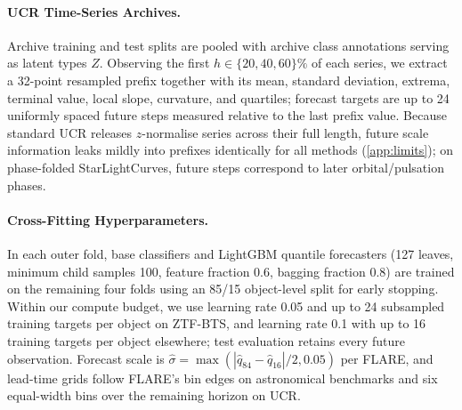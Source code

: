 \paragraph{UCR Time-Series Archives.}
Archive training and test splits are pooled with archive class annotations serving as latent types $Z$.
Observing the first $h\in\{20,40,60\}\%$ of each series, we extract a 32-point resampled prefix together with its mean, standard deviation, extrema, terminal value, local slope, curvature, and quartiles; forecast targets are up to 24 uniformly spaced future steps measured relative to the last prefix value.
Because standard UCR releases $z$-normalise series across their full length, future scale information leaks mildly into prefixes \citep{renault2025early} identically for all methods (\cref{app:limits}); on phase-folded StarLightCurves, future steps correspond to later orbital/pulsation phases.

\paragraph{Cross-Fitting Hyperparameters.}
In each outer fold, base classifiers and LightGBM quantile forecasters (127 leaves, minimum child samples 100, feature fraction 0.6, bagging fraction 0.8) are trained on the remaining four folds using an 85/15 object-level split for early stopping.
Within our compute budget, we use learning rate 0.05 and up to 24 subsampled training targets per object on ZTF-BTS, and learning rate 0.1 with up to 16 training targets per object elsewhere; test evaluation retains every future observation.
Forecast scale is $\hat\sigma=\max(|\hat q_{84}-\hat q_{16}|/2,0.05)$ per FLARE, and lead-time grids follow FLARE's bin edges on astronomical benchmarks and six equal-width bins over the remaining horizon on UCR.

\FloatBarrier

